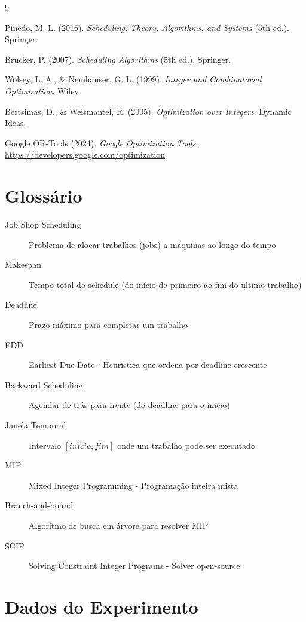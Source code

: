 \documentclass[12pt,a4paper]{article}
\theoremstyle{definition}
\begin{document}
\begin{thebibliography}{9}

Pinedo, M. L. (2016).
\textit{Scheduling: Theory, Algorithms, and Systems} (5th ed.).
Springer.

Brucker, P. (2007).
\textit{Scheduling Algorithms} (5th ed.).
Springer.

Wolsey, L. A., \& Nemhauser, G. L. (1999).
\textit{Integer and Combinatorial Optimization}.
Wiley.

Bertsimas, D., \& Weismantel, R. (2005).
\textit{Optimization over Integers}.
Dynamic Ideas.

Google OR-Tools (2024).
\textit{Google Optimization Tools}.
\url{https://developers.google.com/optimization}

\end{thebibliography}

\appendix

\section{Glossário}

\begin{description}
    \item[Job Shop Scheduling] Problema de alocar trabalhos (jobs) a máquinas ao longo do tempo
    \item[Makespan] Tempo total do schedule (do início do primeiro ao fim do último trabalho)
    \item[Deadline] Prazo máximo para completar um trabalho
    \item[EDD] Earliest Due Date - Heurística que ordena por deadline crescente
    \item[Backward Scheduling] Agendar de trás para frente (do deadline para o início)
    \item[Janela Temporal] Intervalo $[inicio, fim]$ onde um trabalho pode ser executado
    \item[MIP] Mixed Integer Programming - Programação inteira mista
    \item[Branch-and-bound] Algoritmo de busca em árvore para resolver MIP
    \item[SCIP] Solving Constraint Integer Programs - Solver open-source
\end{description}

\section{Dados do Experimento}
\end{document}
